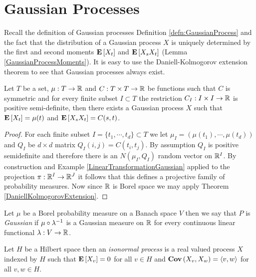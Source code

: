 \chapter{Gaussian Processes}

Recall the definition of Gaussian processes Definition \ref{defn:GaussianProcess} and the fact that the distribution of a Gaussian process $X$ is uniquely 
determined by the first and second moments $\textbf{E}\left[X_t\right]$ and $\textbf{E}\left[X_s X_t\right]$ (Lemma \ref{GaussianProcessMoments}).  It is easy to use 
the Daniell-Kolmogorov extension theorem to see that Gaussian processes always exist. 

\begin{prop}\label{ExistenceGaussianProcess}Let $T$ be a set, $\mu : T \to \mathbb{R}$ and $C : T \times T \to \mathbb{R}$ be functions such that $C$ is symmetric and for every finite subset $I \subset T$ the restriction $C_I : I \times I \to \mathbb{R}$ is positive semi-definite, then there exists a Gaussian process $X$ such that $\textbf{E}\left[X_t\right] = \mu(t)$ and $\textbf{E}\left[X_s X_t\right] = C(s,t)$.
\end{prop}
\begin{proof}
For each finite subset $I = \lbrace t_1, \cdots, t_d \rbrace \subset T$ we let $\mu_I = (\mu(t_1), \cdots, \mu(t_d))$ and $Q_I$ be $d \times d$ matrix $Q_I(i,j) = C(t_i,t_j)$.  By assumption $Q_I$ is positive semidefinite and therefore there is an $N(\mu_I, Q_I)$ random vector on $\mathbb{R}^I$.  By construction and Example \ref{LinearTransformationGaussian} applied to the projection $\pi : \mathbb{R}^I \to \mathbb{R}^J$ it follows that this defines a projective family of probability measures.  Now since $\mathbb{R}$ is Borel space we may apply Theorem \ref{DaniellKolmogorovExtension}.
\end{proof}

\begin{defn}Let $\mu$ be a Borel probability measure on a Banach space $V$ then we say that $P$ is \emph{Gaussian} if $\mu \circ \lambda^{-1}$ is a Gaussian measure on $\mathbb{R}$ for every continuous linear functional $\lambda : V \to \mathbb{R}$.
\end{defn}

\begin{defn}Let $H$ be a Hilbert space then an \emph{isonormal process} is a real valued process $X$ indexed by $H$ such that $\textbf{E}\left[X_v\right] = 0$ for all $v \in H$ and $\textbf{Cov} \left (X_v, X_w \right ) = \langle v, w \rangle$ for all $v,w \in H$.
\end{defn}


